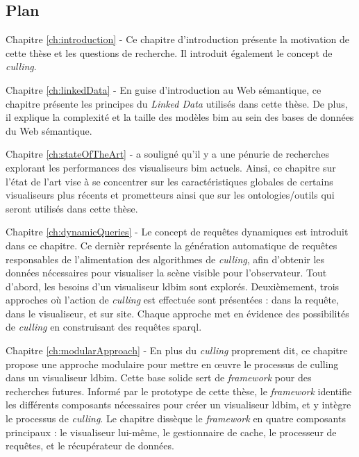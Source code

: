 \begin{refsection}
\begin{multicols}{2}
        \subsection*{Plan}
        \textsf{Chapitre \ref{ch:introduction} -}
        Ce chapitre d'introduction présente la motivation de cette thèse et les questions de recherche. Il introduit également le concept de \emph{culling}.

        \textsf{Chapitre \ref{ch:linkedData} -}
        En guise d'introduction au Web sémantique, ce chapitre présente les principes du \emph{Linked Data} utilisés dans cette thèse. De plus, il explique la complexité et la taille des modèles \ac{bim} au sein des bases de données du Web sémantique.

        \textsf{Chapitre \ref{ch:stateOfTheArt} -}
        \cite{Johansson2015} a souligné qu'il y a une pénurie de recherches explorant les performances des visualiseurs \ac{bim} actuels. Ainsi, ce chapitre sur l'état de l'art vise à se concentrer sur les caractéristiques globales de certains visualiseurs plus récents et prometteurs ainsi que sur les ontologies/outils qui seront utilisés dans cette thèse.

        \textsf{Chapitre \ref{ch:dynamicQueries} -}
        Le concept de requêtes dynamiques est introduit dans ce chapitre. Ce dernièr représente la génération automatique de requêtes responsables de l'alimentation des algorithmes de \emph{culling}, afin d'obtenir les données nécessaires pour visualiser la scène visible pour l'observateur. Tout d'abord, les besoins d'un visualiseur \ac{ldbim} sont explorés. Deuxièmement, trois approches où l'action de \emph{culling} est effectuée sont présentées : dans la requête, dans le visualiseur, et sur site. Chaque approche met en évidence des possibilités de \emph{culling} en construisant des requêtes \ac{sparql}.

        \textsf{Chapitre \ref{ch:modularApproach} -}
        En plus du \emph{culling} proprement dit, ce chapitre propose une approche modulaire pour mettre en œuvre le processus de culling dans un visualiseur \ac{ldbim}. Cette base solide sert de \emph{framework} pour des recherches futures. Informé par le prototype de cette thèse, le \emph{framework} identifie les différents composants nécessaires pour créer un visualiseur \ac{ldbim}, et y intègre le processus de \emph{culling}. Le chapitre dissèque le \emph{framework} en quatre composants principaux : le visualiseur lui-même, le gestionnaire de cache, le processeur de requêtes, et le récupérateur de données.


\end{multicols}
\end{refsection}
